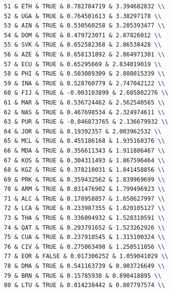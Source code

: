 \documentclass[12pt]{article}
\begin{document}
\begin{enumerate}
\begin{lstlisting}[language=Latex, style=mystyle]
51 & ETH & TRUE & 0.782784719 & 3.394682832 \\
52 & UGA & TRUE & 0.764501613 & 3.38297178 \\
53 & AIN & TRUE & 0.530560258 & 3.205393477 \\
54 & DOM & TRUE & 0.479723071 & 2.87826012 \\
55 & SVK & TRUE & 0.652582368 & 2.86538428 \\
56 & AZE & TRUE & 0.658131892 & 2.864971301 \\
57 & ECU & TRUE & 0.65295669 & 2.834019019 \\
58 & PHI & TRUE & 0.503089309 & 2.808015339 \\
59 & INA & TRUE & 0.528760779 & 2.747042122 \\
60 & FIJ & TRUE & -0.003103899 & 2.605802276 \\
61 & MAR & TRUE & 0.536724462 & 2.562540565 \\
62 & NAS & TRUE & 0.467698534 & 2.324974611 \\
63 & PUR & TRUE & -0.046873765 & 2.136679932 \\
64 & JOR & TRUE & 0.19392357 & 2.003962532 \\
65 & MCL & TRUE & 0.455186168 & 1.935160376 \\
66 & MDA & TRUE & 0.356611343 & 1.911806467 \\
67 & KOS & TRUE & 0.304311493 & 1.867596464 \\
68 & KGZ & TRUE & 0.378210031 & 1.841458856 \\
69 & PRK & TRUE & 0.359432562 & 1.839969699 \\
70 & ARM & TRUE & 0.031476902 & 1.799496923 \\
71 & ALC & TRUE & 0.178958857 & 1.658627997 \\
72 & LCA & TRUE & 0.233987355 & 1.620105127 \\
73 & THA & TRUE & 0.336004932 & 1.528310591 \\
74 & QAT & TRUE & 0.293791652 & 1.523262926 \\
75 & CUA & TRUE & 0.237918545 & 1.315100324 \\
76 & CIV & TRUE & 0.275063498 & 1.250511056 \\
77 & EOR & FALSE & 0.017306252 & 1.059041029 \\
78 & DMA & TRUE & 0.541163739 & 0.903726649 \\
79 & BRN & TRUE & 0.15785938 & 0.890418895 \\
80 & LTU & TRUE & 0.014238442 & 0.807797574 \\

\end{lstlisting}
\end{enumerate}
\end{document}

